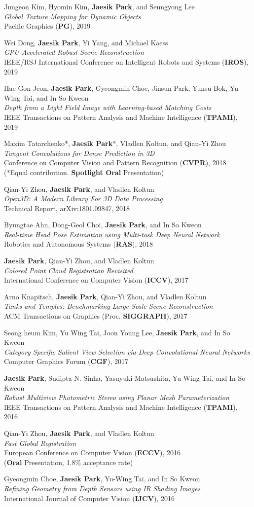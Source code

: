 \documentclass[letterpaper,11pt]{article}
\newcommand{\publicationItem}[4]{
  \small{
  \item{#1\\ \emph{#2}\\ #3\\ #4}
  }
}
\begin{document}
    \publicationItem{Jungeon Kim, Hyomin Kim, \textbf{Jaesik Park}, and Seungyong Lee}{Global Texture Mapping for Dynamic Objects}{Pacific Graphics (\textbf{PG}), 2019}{}
    \publicationItem{Wei Dong, \textbf{Jaesik Park}, Yi Yang, and Michael Kaess}{GPU Accelerated Robust Scene Reconstruction}{IEEE/RSJ International Conference on Intelligent Robots and Systems (\textbf{IROS}), 2019}{}
    \publicationItem{Hae-Gon Jeon, \textbf{Jaesik Park}, Gyeongmin Choe, Jinsun Park, Yunsu Bok, Yu-Wing Tai, and In So Kweon}{Depth from a Light Field Image with Learning-based Matching Costs}{IEEE Transactions on Pattern Analysis and Machine Intelligence (\textbf{TPAMI}), 2019}{}
    \publicationItem{Maxim Tatarchenko*, \textbf{Jaesik Park}*, Vladlen Koltun, and Qian-Yi Zhou}{Tangent Convolutions for Dense Prediction in 3D}{Conference on Computer Vision and Pattern Recognition (\textbf{CVPR}), 2018}{(*Equal contribution. \textbf{Spotlight Oral} Presentation)}
    \publicationItem{Qian-Yi Zhou, \textbf{Jaesik Park}, and Vladlen Koltun}{Open3D: A Modern Library For 3D Data Processing}{Technical Report, arXiv:1801.09847, 2018}{}
    \publicationItem{Byungtae Ahn, Dong-Geol Choi, \textbf{Jaesik Park}, and In So Kweon}{Real-time Head Pose Estimation using Multi-task Deep Neural Network}{Robotics and Autonomous Systems (\textbf{RAS}), 2018}{}
    \publicationItem{\textbf{Jaesik Park}, Qian-Yi Zhou, and Vladlen Koltun}{Colored Point Cloud Registration Revisited}{International Conference on Computer Vision (\textbf{ICCV}), 2017}{}
    \publicationItem{Arno Knapitsch, \textbf{Jaesik Park}, Qian-Yi Zhou, and Vladlen Koltun}{Tanks and Temples: Benchmarking Large-Scale Scene Reconstruction}{ACM Transactions on Graphics (Proc. \textbf{SIGGRAPH}), 2017}{}
    \publicationItem{Seong heum Kim, Yu Wing Tai, Joon Young Lee, \textbf{Jaesik Park}, and In So Kweon}{Category Specific Salient View Selection via Deep Convolutional Neural Networks}{Computer Graphics Forum (\textbf{CGF}), 2017}{}
    \publicationItem{\textbf{Jaesik Park}, Sudipta N. Sinha, Yasuyuki Matsushita, Yu-Wing Tai, and In So Kweon}{Robust Multiview Photometric Stereo using Planar Mesh Parameterization}{IEEE Transactions on Pattern Analysis and Machine Intelligence (\textbf{TPAMI}), 2016}{}
    \publicationItem{Qian-Yi Zhou, \textbf{Jaesik Park}, and Vladlen Koltun}{Fast Global Registration}{European Conference on Computer Vision (\textbf{ECCV}), 2016}{(\textbf{Oral} Presentation, 1.8\% acceptance rate)}
    \publicationItem{Gyeongmin Choe, \textbf{Jaesik Park}, Yu-Wing Tai, and In So Kweon}{Refining Geometry from Depth Sensors using IR Shading Images}{International Journal of Computer Vision (\textbf{IJCV}), 2016}{}
\end{document}
